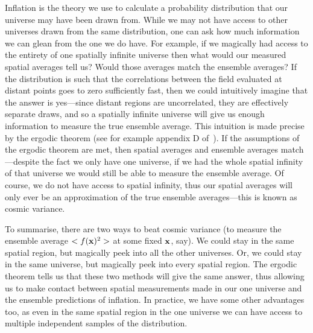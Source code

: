     Inflation is the theory we use to calculate a probability distribution
    that our universe may have been drawn from.
    While we may not have access to other universes drawn from the same distribution,
    one can ask how much information we can glean from the one we do have.
    For example, if we magically had access to the entirety of one spatially
    infinite universe then what would our measured spatial averages tell us?
    Would those averages match the ensemble averages?
    If the distribution is such that the correlations between the field evaluated at distant
    points goes to zero sufficiently fast, then we could intuitively imagine that the answer is
    yes---since distant regions are uncorrelated, they are effectively separate draws, and
    so a spatially infinite universe will give us enough information to measure the true
    ensemble average. This intuition is made precise by the ergodic theorem
    (see for example appendix D of~\cite{Weinberg_cosmo}).
    If the assumptions of the ergodic theorem are met,
    then spatial averages and ensemble averages
    match---despite the fact we only have one universe,
    if we had the whole spatial infinity of that universe
    we would still be able to measure the ensemble average.
    Of course, we do not have access to spatial infinity,
    thus our spatial averages will only ever be an approximation of the
    true ensemble averages---this is known as cosmic variance.


    To summarise,
    there are two ways to beat cosmic variance (to measure the ensemble
    average $<f(\mathbf{x})^2>$ at some fixed $\mathbf{x}$, say).
    We could stay in the same spatial region, but magically peek into all the other universes.
    Or, we could stay in the same universe, but magically peek into every spatial region.
    The ergodic theorem tells us that these two methods will give the same answer,
    thus allowing us to make contact between spatial measurements made in
    our one universe and the ensemble predictions of inflation.
    In practice, we have some other advantages too,
    as even in the same spatial region in the one universe we can have access to multiple
    independent samples of the distribution.


